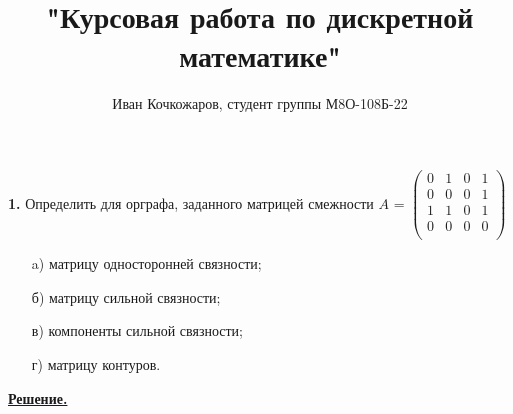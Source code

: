 \documentclass[12pt, letterpaper, titlepage]{article}
\title{"Курсовая работа по дискретной математике"}
\author{Иван Кочкожаров, студент группы М8О-108Б-22}
\begin{document}
\maketitle
\textbf{1.} Определить для орграфа, заданного матрицей смежности $A$ =
$
    \begin{pmatrix}
        0 & 1 & 0 & 1 \\
        0 & 0 & 0 & 1 \\
        1 & 1 & 0 & 1 \\
        0 & 0 & 0 & 0 \\
    \end{pmatrix}
$
\begin{itemize}
    \item[a)] матрицу односторонней связности;
    \item[б)] матрицу сильной связности;
    \item[в)] компоненты сильной связности;
    \item[г)] матрицу контуров.
\end{itemize}
\underline{\textbf{Решение.}}
\end{document}
